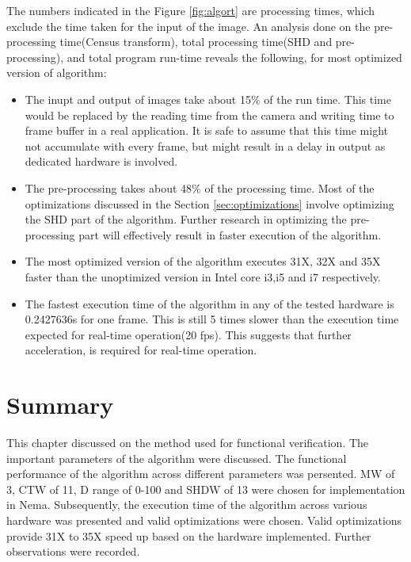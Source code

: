 The numbers indicated in the Figure \ref{fig:algort} are processing times, which exclude the time taken for the input of the image. An analysis done on the pre-processing time(Census transform), total processing time(SHD and pre-processing), and total program run-time reveals the following, for most optimized version of algorithm:
\begin{itemize}
\item{The inupt and output of images take about 15\% of the run time. This time would be replaced by the reading time from the camera and writing time to frame buffer in a real application. It is safe to assume that this time might not accumulate with every frame, but might result in a delay in output as dedicated hardware is involved.}
\item{The pre-processing takes about 48\% of the processing time. Most of the optimizations discussed in the Section \ref{sec:optimizations} involve optimizing the SHD part of the algorithm. Further research in optimizing the pre-processing part will effectively result in faster execution of the algorithm.}
\item{The most optimized version of the algorithm executes 31X, 32X and 35X faster than the unoptimized version in Intel core i3,i5 and i7 respectively.}
\item{The fastest execution time of the algorithm in any of the tested hardware is 0.2427636s for one frame. This is still 5 times slower than the execution time expected for real-time operation(20 fps). This suggests that further acceleration, is required for real-time operation.}
\end{itemize}

\section{Summary}
This chapter discussed on the method used for functional verification. The important parameters of the algorithm were discussed. The functional performance of the algorithm across different parameters was persented. MW of 3, CTW of 11, D range of 0-100 and SHDW of 13 were chosen for implementation in Nema. Subsequently, the execution time of the algorithm across various hardware was presented and valid optimizations were chosen. Valid optimizations provide 31X to 35X speed up based on the hardware implemented. Further observations were recorded.